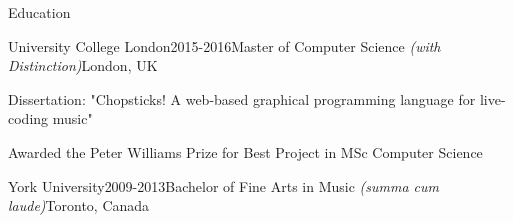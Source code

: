 \documentclass{resume} %
\begin{document}

\begin{rSection}{Education}
    
    \begin{rSubsection}{{University College London}}{2015-2016}{Master of Computer Science {\em (with Distinction)}}{London, UK} 
        \item Dissertation: "Chopsticks! A web-based graphical programming language for live-coding music"
        \item Awarded the Peter Williams Prize for Best Project in MSc Computer Science
    \end{rSubsection}
    
    
    \begin{rSubsection}{{York University}}{2009-2013}{Bachelor of Fine Arts in Music {\em (summa cum laude)}}{Toronto, Canada}
        \item[]
    \end{rSubsection}
    
\end{rSection}
    








\end{document}
